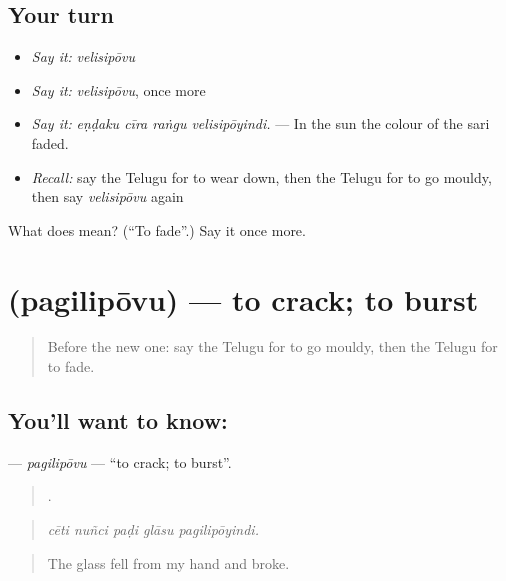 \subsection*{Your turn}
\begin{itemize}
\raggedright
  \item \emph{Say it:} \emph{velisipōvu}
  \item \emph{Say it:} \emph{velisipōvu}, once more
  \item \emph{Say it:} \emph{eṇḍaku cīra raṅgu velisipōyindi.} — In the sun the colour of the sari faded.
  \item \emph{Recall:} say the Telugu for to wear down, then the Telugu for to go mouldy, then say \emph{velisipōvu} again
\end{itemize}

\begin{tcolorbox}[breakable,colback=teal!4,colframe=teal!35!black,title={Before you move on}]
What does  mean? (\textquotedblleft{}To fade\textquotedblright{}.) Say it once more.
\end{tcolorbox}
\section[\texorpdfstring{\te{పగిలిపోవు} (pagilipōvu)}{పగిలిపోవు (pagilipōvu)}]{ (pagilipōvu) — to crack; to burst}

\label{lesson:TE-C491-pagilipovu}



\begin{quote}
Before the new one: say the Telugu for to go mouldy, then the Telugu for to fade.
\end{quote}

\subsection*{You'll want to know: }
\textbf{} — \emph{pagilipōvu} — \textquotedblleft{}to crack; to burst\textquotedblright{}.

\begin{quote}
    .
\end{quote}

\begin{quote}
\emph{cēti nuñci paḍi glāsu pagilipōyindi.}
\end{quote}

\begin{quote}
The glass fell from my hand and broke.
\end{quote}

